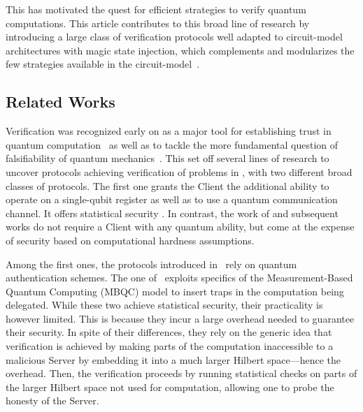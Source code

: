 This has motivated the quest for efficient strategies to verify quantum computations. This article contributes to this broad line of research by introducing a large class of verification protocols well adapted to circuit-model architectures with magic state injection, which complements and modularizes the few strategies available in the circuit-model~\cite{B18how,BN25noise}.

\subsection{Related Works}
\label{subsection:related works}
Verification was recognized early on as a major tool for establishing trust in quantum computation~\cite{A07scott} as well as to tackle the more fundamental question of falsifiability of quantum mechanics~\cite{V07conference,AV12is}. This set off several lines of research to uncover protocols achieving verification of problems in , with two different broad classes of protocols. The first one grants the Client the additional ability to operate on a single-qubit register as well as to use a quantum communication channel. It offers statistical security \cite{ABE08interactive,ABEM17interactive,FK17unconditionally,B18how,LMKO21verifying,KKLM22unifying}. In contrast, the work of \cite{M18classical} and subsequent works \cite{ACGH20non,BKLM22succinct} do not require a Client with any quantum ability, but come at the expense of security based on computational hardness assumptions.

Among the first ones, the protocols introduced in~\cite{ABE08interactive,ABEM17interactive} rely on quantum authentication schemes. The one of~\cite{FK17unconditionally} exploits specifics of the Measurement-Based Quantum Computing (MBQC) model to insert traps in the computation being delegated. While these two achieve statistical security, their practicality is however limited. This is because they incur a large overhead needed to guarantee their security. In spite of their differences, they rely on the generic idea that verification is achieved by making parts of the computation inaccessible to a malicious Server by embedding it into a much larger Hilbert space---hence the overhead. Then, the verification proceeds by running statistical checks on parts of the larger Hilbert space not used for computation, allowing one to probe the honesty of the Server.

